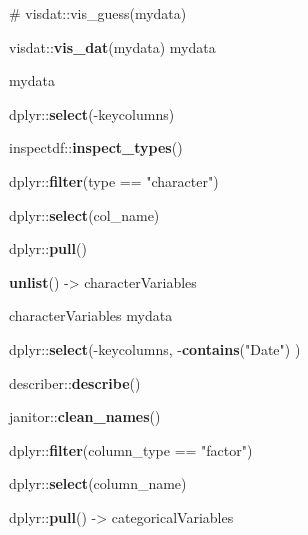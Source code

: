 \documentclass[
]{article}
\newenvironment{Shaded}{\begin{snugshade}}{\end{snugshade}}
\newcommand{\CommentTok}[1]{\textcolor[rgb]{0.54,0.53,0.53}{#1}}
\newcommand{\KeywordTok}[1]{\textcolor[rgb]{0.12,0.11,0.11}{\textbf{#1}}}
\newcommand{\NormalTok}[1]{\textcolor[rgb]{0.12,0.11,0.11}{#1}}
\newcommand{\OperatorTok}[1]{\textcolor[rgb]{0.12,0.11,0.11}{#1}}
\newcommand{\StringTok}[1]{\textcolor[rgb]{0.75,0.01,0.01}{#1}}
\begin{document}
\begin{Shaded}
\begin{Highlighting}[]
{{{{{{{{{{{{{{{{{\CommentTok{# visdat::vis_guess(mydata)}

\NormalTok{visdat}\OperatorTok{::}\KeywordTok{vis_dat}\NormalTok{(mydata)}
\NormalTok{mydata }\OperatorTok{%>%}\StringTok{ }\NormalTok{explore}\OperatorTok{::}\KeywordTok{explore_tbl}\NormalTok{()}
\NormalTok{mydata }\OperatorTok{%>%}\StringTok{ }
\StringTok{    }\NormalTok{dplyr}\OperatorTok{::}\KeywordTok{select}\NormalTok{(}\OperatorTok{-}\NormalTok{keycolumns) }\OperatorTok{%>%}\StringTok{ }
\StringTok{    }\NormalTok{inspectdf}\OperatorTok{::}\KeywordTok{inspect_types}\NormalTok{() }\OperatorTok{%>%}\StringTok{ }
\StringTok{    }\NormalTok{dplyr}\OperatorTok{::}\KeywordTok{filter}\NormalTok{(type }\OperatorTok{==}\StringTok{ "character"}\NormalTok{) }\OperatorTok{%>%}\StringTok{ }
\StringTok{    }\NormalTok{dplyr}\OperatorTok{::}\KeywordTok{select}\NormalTok{(col_name) }\OperatorTok{%>%}\StringTok{ }
\StringTok{    }\NormalTok{dplyr}\OperatorTok{::}\KeywordTok{pull}\NormalTok{() }\OperatorTok{%>%}\StringTok{ }
\StringTok{    }\KeywordTok{unlist}\NormalTok{() ->}\StringTok{ }\NormalTok{characterVariables}

\NormalTok{characterVariables}
\NormalTok{mydata }\OperatorTok{%>%}
\StringTok{    }\NormalTok{dplyr}\OperatorTok{::}\KeywordTok{select}\NormalTok{(}\OperatorTok{-}\NormalTok{keycolumns,}
                  \OperatorTok{-}\KeywordTok{contains}\NormalTok{(}\StringTok{"Date"}\NormalTok{)}
\NormalTok{                  ) }\OperatorTok{%>%}
\StringTok{  }\NormalTok{describer}\OperatorTok{::}\KeywordTok{describe}\NormalTok{() }\OperatorTok{%>%}\StringTok{ }
\StringTok{    }\NormalTok{janitor}\OperatorTok{::}\KeywordTok{clean_names}\NormalTok{() }\OperatorTok{%>%}\StringTok{ }
\StringTok{    }\NormalTok{dplyr}\OperatorTok{::}\KeywordTok{filter}\NormalTok{(column_type }\OperatorTok{==}\StringTok{ "factor"}\NormalTok{) }\OperatorTok{%>%}\StringTok{ }
\StringTok{    }\NormalTok{dplyr}\OperatorTok{::}\KeywordTok{select}\NormalTok{(column_name) }\OperatorTok{%>%}\StringTok{ }
\StringTok{    }\NormalTok{dplyr}\OperatorTok{::}\KeywordTok{pull}\NormalTok{() ->}\StringTok{ }\NormalTok{categoricalVariables}

}}}}}}}}}}}}}}}}}}}}}}}}}}}}}}
\end{Highlighting}
\end{Shaded}
\end{document}
